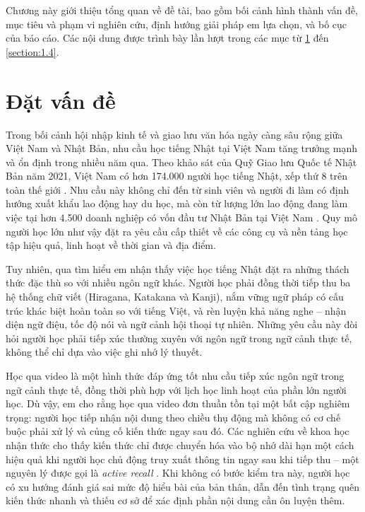 \documentclass[../DoAn.tex]{subfiles}
\begin{document}
Chương này giới thiệu tổng quan về đề tài, bao gồm bối cảnh hình thành vấn đề, mục tiêu và phạm vi nghiên cứu, định hướng giải pháp em lựa chọn, và bố cục của báo cáo. Các nội dung được trình bày lần lượt trong các mục từ \ref{section:1.1} đến \ref{section:1.4}.

\section{Đặt vấn đề}
\label{section:1.1}

Trong bối cảnh hội nhập kinh tế và giao lưu văn hóa ngày càng sâu rộng giữa Việt Nam và Nhật Bản, nhu cầu học tiếng Nhật tại Việt Nam tăng trưởng mạnh và ổn định trong nhiều năm qua. Theo khảo sát của Quỹ Giao lưu Quốc tế Nhật Bản năm 2021, Việt Nam có hơn 174.000 người học tiếng Nhật, xếp thứ 8 trên toàn thế giới \cite{japanfoundation2021}. Nhu cầu này không chỉ đến từ sinh viên và người đi làm có định hướng xuất khẩu lao động hay du học, mà còn từ lượng lớn lao động đang làm việc tại hơn 4.500 doanh nghiệp có vốn đầu tư Nhật Bản tại Việt Nam \cite{jetro2023}. Quy mô người học lớn như vậy đặt ra yêu cầu cấp thiết về các công cụ và nền tảng học tập hiệu quả, linh hoạt về thời gian và địa điểm.

Tuy nhiên, qua tìm hiểu em nhận thấy việc học tiếng Nhật đặt ra những thách thức đặc thù so với nhiều ngôn ngữ khác. Người học phải đồng thời tiếp thu ba hệ thống chữ viết (Hiragana, Katakana và Kanji), nắm vững ngữ pháp có cấu trúc khác biệt hoàn toàn so với tiếng Việt, và rèn luyện khả năng nghe -- nhận diện ngữ điệu, tốc độ nói và ngữ cảnh hội thoại tự nhiên. Những yêu cầu này đòi hỏi người học phải tiếp xúc thường xuyên với ngôn ngữ trong ngữ cảnh thực tế, không thể chỉ dựa vào việc ghi nhớ lý thuyết.

Học qua video là một hình thức đáp ứng tốt nhu cầu tiếp xúc ngôn ngữ trong ngữ cảnh thực tế, đồng thời phù hợp với lịch học linh hoạt của phần lớn người học. Dù vậy, em cho rằng học qua video đơn thuần tồn tại một bất cập nghiêm trọng: người học tiếp nhận nội dung theo chiều thụ động mà không có cơ chế buộc phải xử lý và củng cố kiến thức ngay sau đó. Các nghiên cứu về khoa học nhận thức cho thấy kiến thức chỉ được chuyển hóa vào bộ nhớ dài hạn một cách hiệu quả khi người học chủ động truy xuất thông tin ngay sau khi tiếp thu -- một nguyên lý được gọi là \textit{active recall} \cite{roediger2006}. Khi không có bước kiểm tra này, người học có xu hướng đánh giá sai mức độ hiểu bài của bản thân, dẫn đến tình trạng quên kiến thức nhanh và thiếu cơ sở để xác định phần nội dung cần ôn luyện thêm.
\end{document}
